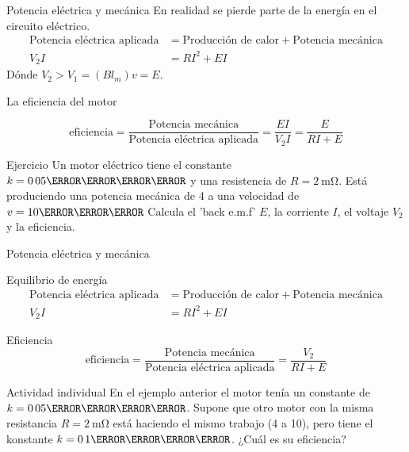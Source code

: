 \documentclass[presentation,aspectratio=169]{beamer}
\begin{document}
\begin{frame}[label={sec:orgf784022}]{Potencia eléctrica y mecánica}
En realidad se pierde parte de la energía en el circuito eléctrico.
\begin{align*}
\text{Potencia eléctrica aplicada} &= \text{Producción de calor} + \text{Potencia mecánica}\\
V_2 I &= RI^2 + EI
\end{align*}
Dónde \(V_2 > V_1 = (Bl_m)v = E\).

La eficiencia del motor

\[ \text{eficiencia} = \frac{\text{Potencia mecánica}}{\text{Potencia eléctrica aplicada}} = \frac{EI}{V_2I} = \frac{E}{RI + E}\]

\alert{Ejercicio} Un motor eléctrico tiene el constante \(k=\unit{0.05}{\kilo\newton\per\ampere}\) y una resistencia de \(R=\SI{2}{\milli\ohm}\). Está produciendo una potencia mecánica de \unit{4}{\mega\watt} a una velocidad de \(v=\unit{10}{\meter\per\second}\) Calcula el 'back e.m.f' \(E\), la corriente \(I\), el voltaje \(V_2\) y la eficiencia.
\end{frame}

\begin{frame}[label={sec:org0d2f625}]{Potencia eléctrica y mecánica}
\begin{block}{Equilibrio de energía}
\begin{align*}
\text{Potencia eléctrica aplicada} &= \text{Producción de calor} + \text{Potencia mecánica}\\
V_2 I &= RI^2 + EI
\end{align*}
\end{block}
\begin{block}{Eficiencia}
\[ \text{eficiencia} = \frac{\text{Potencia mecánica}}{\text{Potencia eléctrica aplicada}} = \frac{V_2}{RI + E}\]

\alert{Actividad individual} En el ejemplo anterior el motor tenía un constante de \(k=\unit{0.05}{\kilo\newton\per\ampere}\). Supone que otro motor con la misma resistancia \(R=\SI{2}{\milli\ohm}\) está haciendo el mismo trabajo (\unit{4}{\mega\watt} a \unit{10}{\meter\per\second}), pero tiene el konstante \(k=\unit{0.1}{\kilo\newton\per\ampere}\). ¿Cuál es su eficiencia?
\end{block}
\end{frame}
\end{document}
